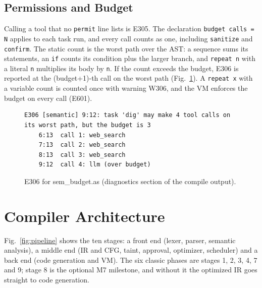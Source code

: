 \documentclass[conference]{IEEEtran}
\begin{document}
\subsection{Permissions and Budget}
Calling a tool that no \texttt{permit} line lists is E305. The declaration \texttt{budget calls = N} applies to each task run, and every call counts as one, including \texttt{sanitize} and \texttt{confirm}. The static count is the worst path over the AST: a sequence sums its statements, an \texttt{if} counts its condition plus the larger branch, and \texttt{repeat n} with a literal \texttt{n} multiplies its body by \texttt{n}. If the count exceeds the budget, E306 is reported at the (budget+1)-th call on the worst path (Fig.~\ref{fig:e306}). A \texttt{repeat x} with a variable count is counted once with warning W306, and the VM enforces the budget on every call (E601).

\begin{figure}[!htb]
\begin{lstlisting}
E306 [semantic] 9:12: task 'dig' may make 4 tool calls on its worst path, but the budget is 3
    6:13  call 1: web_search
    7:13  call 2: web_search
    8:13  call 3: web_search
    9:12  call 4: llm (over budget)
\end{lstlisting}
\caption{E306 for sem\_budget.as (diagnostics section of the compile output).}
\label{fig:e306}
\end{figure}

\section{Compiler Architecture}
Fig.~\ref{fig:pipeline} shows the ten stages: a front end (lexer, parser, semantic analysis), a middle end (IR and CFG, taint, approval, optimizer, scheduler) and a back end (code generation and VM). The six classic phases are stages 1, 2, 3, 4, 7 and 9; stage 8 is the optional M7 milestone, and without it the optimized IR goes straight to code generation.
\end{document}
